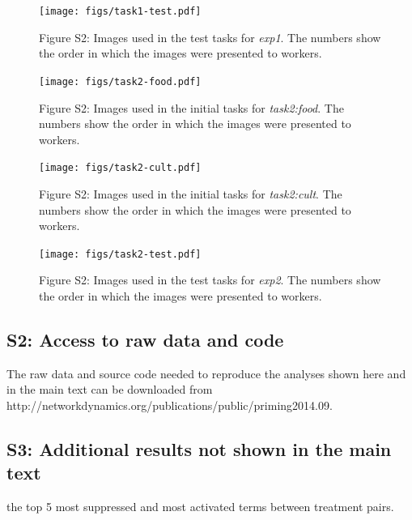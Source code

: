 \documentclass[12pt]{article}
\begin{document}
\begin{figure}
	\texttt{[image: figs/task1-test.pdf]}
	\label{fig:task1:test}
	\caption{
		Figure S2: Images used in the test tasks for 
		\textit{exp1}.  The numbers show the order in which the 
		images were presented to workers.
	}
\end{figure}

\begin{figure}
	\texttt{[image: figs/task2-food.pdf]}
	\label{fig:task2:food}
	\caption{
		Figure S2: Images used in the initial tasks for 
		\textit{task2:food}.  The numbers show the order in which the 
		images were presented to workers.
	}
\end{figure}

\begin{figure}
	\texttt{[image: figs/task2-cult.pdf]}
	\label{fig:task2:cult}
	\caption{
		Figure S2: Images used in the initial tasks for 
		\textit{task2:cult}.  The numbers show the order in which the 
		images were presented to workers.
	}
\end{figure}

\begin{figure}
	\texttt{[image: figs/task2-test.pdf]}
	\label{fig:task2:test}
	\caption{
		Figure S2: Images used in the test tasks for 
		\textit{exp2}.  The numbers show the order in which the 
		images were presented to workers.
	}
\end{figure}

\subsection*{S2: Access to raw data and code}
The raw data and source code needed to reproduce the analyses 
shown here and in the main text can be downloaded from 
http://networkdynamics.org/publications/public/priming2014.09.

\subsection*{S3: Additional results not shown in the main text}
		the top 5 most suppressed and most activated terms between treatment
		pairs.
\end{document}
